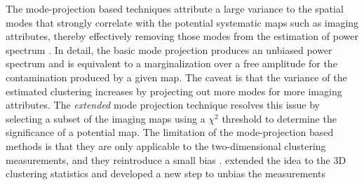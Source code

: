 The mode-projection based techniques attribute a large variance to the spatial modes that strongly correlate with the potential systematic maps such as imaging attributes, thereby effectively removing those modes from the estimation of power spectrum \citep[see e.g.][]{rybicki1992interpolation,tegmark1997measure,tegmark1998measuring,slosar2004exact,ho2008correlation, pullen2013systematic,leistedt2013estimating,leistedt2014exploiting}. In detail, the basic mode projection \citep{leistedt2013estimating} produces an unbiased power spectrum and is equivalent to a marginalization over a free amplitude for the contamination produced by a given map.
 The caveat is that the variance of the estimated clustering increases by projecting out more modes for more imaging attributes. The \textit{extended} mode projection technique \citep{leistedt2014exploiting} resolves this issue by selecting a subset of the imaging maps using a $\chi^{2}$ threshold to determine the significance of a potential map. The limitation of the mode-projection based methods is that they are only applicable to the two-dimensional clustering measurements, and they reintroduce a small bias \citep{elsner2015unbiased}. \citet{kalus2016unbiased} extended the idea to the 3D clustering statistics and developed a new step to unbias the measurements~\citep[for an application on SDSS-III BOSS data see e.g.,][]{kalus2018map}\\

